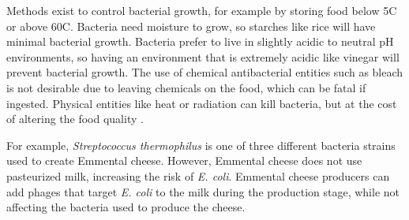 Methods exist to control bacterial growth, for example by storing food below 5\textdegree C or above 60\textdegree C.
Bacteria need moisture to grow, so starches like rice will have minimal bacterial growth.
Bacteria prefer to live in slightly acidic to neutral pH environments, so having an environment that is extremely acidic like vinegar will prevent bacterial growth.
The use of chemical antibacterial entities such as bleach is not desirable due to leaving chemicals on the food, which can be fatal if ingested.
Physical entities like heat or radiation can kill bacteria, but at the cost of altering the food quality \cite{fieseler_food_2021}. 

For example, \textit{Streptococcus thermophilus} is one of three different bacteria strains used to create Emmental cheese.
However, Emmental cheese does not use pasteurized milk, increasing the risk of \textit{E. coli}.
Emmental cheese producers can add phages that target \textit{E. coli} to the milk during the production stage, while not affecting the bacteria used to produce the cheese. 

